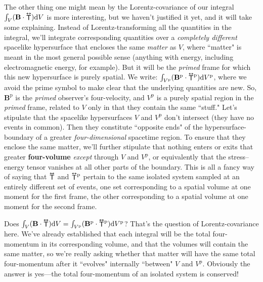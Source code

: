 \documentclass[12pt]{article}
\renewcommand{\vv}[1]{\mathbf{#1}}
\newcommand{\dd}[1]{\mathrm{d}#1}
\newcommand{\tightoverset}[2]{%
  \mathop{#2}\limits^{\vbox to -.5ex{\kern-0.75ex\hbox{$#1$}\vss}}}
\newcommand{\inlinedy}[1]{\tightoverset{\text{\tiny$\bm\leftrightarrow$}}{#1}}
\begin{document}
The other thing one might mean by the Lorentz-covariance of our integral ${\int_V (\vv B \cdot {\inlinedy{\mathsf{T}}}) \dd V}$ is more interesting, but we haven't justified it yet, and it will take some explaining. Instead of Lorentz-transforming all the quantities in the integral, we'll integrate corresponding quantities over a \emph{completely different} spacelike hypersurface that encloses the same \emph{matter} as $V$, where ``matter" is meant in the most general possible sense (anything with energy, including electromagnetic energy, for example). But it will be the \emph{primed} frame for which this new hypersurface is purely spatial. We write: $\int_{V^\textrm{p}} (\vv B^{\textrm{p}} \cdot {\inlinedy{\mathsf{T}}} ^{\textrm{p}} ) \dd V^\textrm{p}$, where we avoid the prime symbol to make clear that the underlying quantities are new. So, $\vv B^{\textrm{p}}$ is the \emph{primed} observer's four-velocity, and $V^\textrm{p}$ is a purely spatial region in the \emph{primed} frame, related to $V$ only in that they contain the same ``stuff." Let's stipulate that the spacelike hypersurfaces $V$ and $V^\textrm{p}$ don't intersect (they have no events in common). Then they constitute ``opposite ends" of the hypersurface-boundary of a greater \emph{four-dimensional} spacetime region. To ensure that they enclose the same matter, we'll further stipulate that nothing enters or exits that greater \textbf{four-volume} \emph{except} through $V$ and $V^\textrm{p}$, or equivalently that the stress--energy tensor vanishes at all other parts of the boundary. This is all a fancy way of saying that ${\inlinedy{\mathsf{T}}}$ and ${\inlinedy{\mathsf{T}}} ^{\textrm{p}}$ pertain to the same isolated system sampled at an entirely different set of events, one set corresponding to a spatial volume at one moment for the first frame, the other corresponding to a spatial volume at one moment for the second frame.

Does ${\int_V (\vv B \cdot {\inlinedy{\mathsf{T}}} ) \dd V} = \int_{V^\textrm{p}} (\vv B^{\textrm{p}} \cdot {\inlinedy{\mathsf{T}}} ^{\textrm{p}} ) \dd V^\textrm{p}$? That's the question of Lorentz-covariance here. We've already established that each integral will be the total four-momentum in its corresponding volume, and that the volumes will contain the same matter, so we're really asking whether that matter will have the same total four-momentum after it ``evolves" internally ``between" $V$ and $V^{\textrm{p}}$. Obviously the answer is yes---the total four-momentum of an isolated system is conserved!
\end{document}
